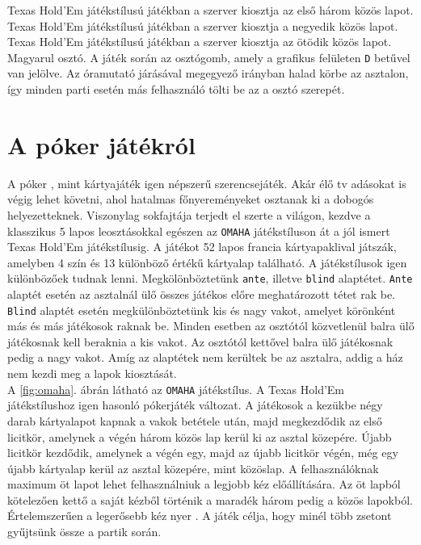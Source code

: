 Texas Hold'Em játékstílusú játékban a szerver kiosztja az első három közös lapot.
Texas Hold'Em játékstílusú játékban a szerver kiosztja a negyedik közös lapot.
Texas Hold'Em játékstílusú játékban a szerver kiosztja az ötödik közös lapot.
Magyarul osztó. A játék során az osztógomb, amely a grafikus felületen \texttt{D} betűvel van jelölve. Az óramutató járásával megegyező irányban halad körbe az asztalon, így minden parti esetén más felhasználó tölti be az a osztó szerepét.

\section{A póker játékról}
A póker \cite{poker_game}, mint kártyajáték igen népszerű szerencsejáték. Akár élő tv adásokat is végig lehet követni, ahol hatalmas főnyereményeket osztanak ki a dobogós helyezetteknek. Viszonylag sokfajtája terjedt el szerte a világon, kezdve a klasszikus 5 lapos leosztásokkal egészen az \texttt{OMAHA} játékstíluson át a jól ismert Texas Hold'Em játékstílusig. A játékot 52 lapos francia kártyapaklival játszák, amelyben 4 szín és 13 különböző értékű kártyalap található. A játékstílusok igen különbözőek tudnak lenni. Megkölönböztetünk \texttt{ante}, illetve \texttt{blind} alaptétet. \texttt{Ante} alaptét esetén az asztalnál ülő összes játékos előre meghatározott tétet rak be. \texttt{Blind} alaptét esetén megkülönböztetünk kis és nagy vakot, amelyet körönként más és más játékosok raknak be. Minden esetben az osztótól közvetlenül balra ülő játékosnak kell beraknia a kis vakot. Az osztótól kettővel balra ülő játékosnak pedig a nagy vakot. Amíg az alaptétek nem kerültek be az asztalra, addig a ház nem kezdi meg a lapok kiosztását. \\
A \ref{fig:omaha}. ábrán látható az \texttt{OMAHA} \cite{omaha_poker} játékstílus. A Texas Hold'Em játékstílushoz igen hasonló pókerjáték változat. A játékosok a kezükbe négy darab kártyalapot kapnak a vakok betétele után, majd megkezdődik az első licitkör, amelynek a végén három közös lap kerül ki az asztal közepére. Újabb licitkör kezdődik, amelynek a végén egy, majd az újabb licitkör végén, még egy újabb kártyalap kerül az asztal közepére, mint közöslap. A felhasználóknak maximum öt lapot lehet felhasználniuk a legjobb kéz előállítására. Az öt lapból kötelezően kettő a saját kézből történik a maradék három pedig a közös lapokból. Értelemszerűen a legerősebb kéz nyer \cite{card_combinations}. A játék célja, hogy minél több zsetont gyűjtsünk össze a partik során.
